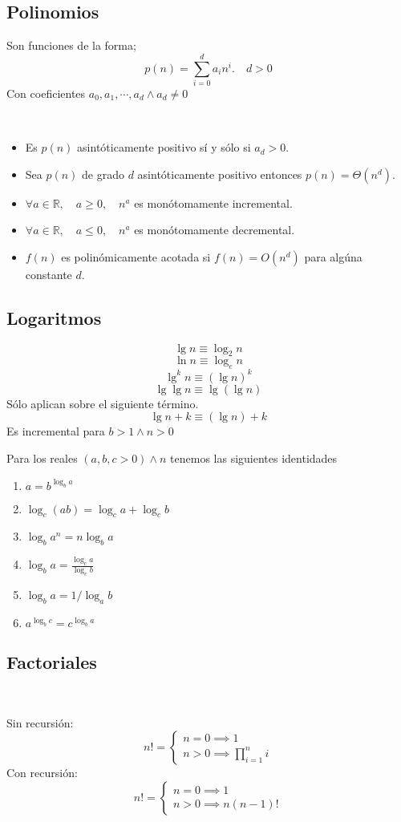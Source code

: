 \documentclass[tikz,11pt,fleqn]{book} %
\begin{document}
\subsection{Polinomios}
Son funciones de la forma;
$$
	p(n)=\sum_{i=0}^d a_in^i.\quad d>0
$$
Con coeficientes $a_0,a_1, \cdots,a_d\land a_d\neq0$
\begin{theorem}~
	\begin{itemize}
		\item Es $p(n)$ asintóticamente positivo sí y sólo si $a_d>0$.
		\item Sea $p(n)$ de grado $d$ asintóticamente positivo entonces $p(n)=\Theta(n^d)$.
		\item $\forall a\in \mathbb R,\quad a\ge0,\quad n^a$ es monótomamente incremental.
		\item $\forall a\in \mathbb R,\quad a\le0,\quad n^a$ es monótomamente decremental.
		\item $f(n)$ es polinómicamente acotada si $f(n)=O(n^d)$ para algúna constante $d$.
	\end{itemize}
\end{theorem}

\subsection{Logaritmos}
\begin{definition}[Notaciones]
	$$\lg n\equiv \log_2 n$$
	$$\ln n\equiv \log_e n$$
	$$\lg^k n\equiv (\lg n)^k$$
	$$\lg\lg n\equiv \lg(\lg n)$$
	Sólo aplican sobre el siguiente término.
	$$ \lg n+k\equiv (\lg n) +k $$
	Es incremental para $b>1\land n>0$
\end{definition}


\begin{theorem}[Identidades]
	Para los reales $(a,b,c>0)\land n$ tenemos las siguientes identidades
	\begin{enumerate}
		\item $a=b^{\log_ba}$
		\item $\log_c(ab)=\log_ca+\log_cb$
		\item $\log_ba^n=n\log_ba$
		\item $\log_ba=\frac{\log_ca}{\log_cb}$
		\item $\log_ba=1/\log_ab$
		\item $a^{\log_bc}=c^{\log_ba}$
	\end{enumerate}
\end{theorem}

\subsection{Factoriales}
\begin{definition}~

	Sin recursión:
	$$n!=
		\begin{cases}
			n=0\implies 1 \\
			n>0\implies \prod_{i=1}^n i
		\end{cases}$$
	Con recursión:
	$$n!=
		\begin{cases}
			n=0 \implies 1 \\
			n>0 \implies n(n-1)!
		\end{cases}$$
\end{definition}
\end{document}
